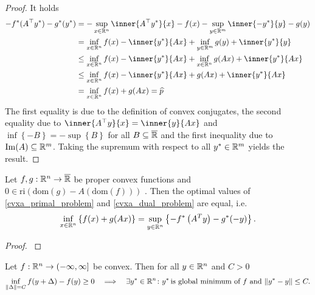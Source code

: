 \begin{proof}
  It holds
  \begin{align*}
    - f^*(A^\top y^*) - g^*(y^*) 
    &=
      -\sup_{x\in \R^n}\inner{A^\top y^*}{x}-f(x)
      -\sup_{y\in \R^m}\inner{-y^*}{y}-g(y)
      \\
    &=
    \inf_{x\in \R^n}f(x)-\inner{y^*}{Ax}
      +\inf_{y\in \R^m}g(y)+\inner{y^*}{y}
      \\
    &\le
      \inf_{x\in \R^n}f(x)-\inner{y^*}{Ax}
      +\inf_{x\in \R^n}g(Ax)+\inner{y^*}{Ax}
      \\
    &\le
      \inf_{x\in \R^n}f(x)-\inner{y^*}{Ax} + g(Ax) + \inner{y^*}{Ax}
      \\
    &=  
      \inf_{x\in \R^n}f(x)+g(Ax)
    =
      \widehat{p}
  \end{align*}
  The first equality is due to the definition of convex conjugates, the second equality due to $\inner{A^\top y}{x}=\inner{y}{Ax}$ and $\inf \left\{ -B \right\}=-\sup \left\{ B \right\}$ for all $B \subseteq \overline{\mathbb{R}}$ and the first inequality due to $\mathrm{Im}(A)\subseteq \mathbb{R}^m$.
  Taking the supremum with respect to all 
  $y^*\in\mathbb{R}^m$
  yields the result.
\end{proof}
\begin{theorem}
  \label{cvxa_fenchel_theorem}
  Let 
  $f, g : \mathbb{R}^n \to \overline{\mathbb{R}}$ 
  be proper convex functions
  and
  $0 \in \text{ri}(\text{dom}(g) - A (\text{dom}(f)) )$
  .
  Then the optimal values of \eqref{cvxa_primal_problem} and \eqref{cvxa_dual_problem} are equal, 
  i.e.
  \begin{gather}
    \inf_{x \in \mathbb{R}^n} 
    \left\{ f(x) + g(Ax) \right\}
    =
    \sup_{y \in \mathbb{R}^n} \left\{   -f^* \left( A^T y \right) - g^*(-y) \right\}
    .
  \end{gather}
\end{theorem}
\begin{proof}
  \cite[Theorem~4.63]{Mordukhovich2022}
\end{proof}
\begin{lemma}
  \label{syu_1_result}
  Let 
  $f : \mathbb{R}^n \to (-\infty, \infty]$ 
  be convex.
  Then 
  for all $y \in \mathbb{R}^n$ and $C>0$ 
    \begin{gather}
      \label{7060_0}
      \inf_{\left\lVert\Delta\right\rVert=C} f(y+\Delta) - f(y) \ge 0 \quad
      \Longrightarrow
      \quad
    \exists y^* \in \mathbb{R}^n
    \colon
    y^* \,\text{is global minimum of $f$ and}\,
      \left\lVert y^* - y\right\rVert \le C.
    \end{gather}
\end{lemma}
